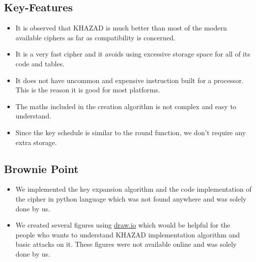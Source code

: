 \documentclass[preprint]{transcrypto}
\begin{document}
\subsection{Key-Features}
\begin{itemize}
    \item It is observed that KHAZAD is much better than most of the modern available ciphers as far as compatibility is concerned.
    \item It is a very fast cipher and it avoids using excessive storage space for all of its code and tables.
    \item It does not have uncommon and expensive instruction built for a processor. This is the reason it is good for most platforms.
    \item The maths included in the creation algorithm is not complex and easy to understand.
    \item Since the key schedule is similar to the round function, we don't require any extra storage.
\end{itemize}
\subsection{Brownie Point}
\begin{itemize}
    \item We implemented the key expansion algorithm and the code implementation of the cipher in python language which was not found anywhere and was solely done by us.
    \item We created several figures using \url{draw.io} which would be helpful for the people who wants to understand KHAZAD implementation algorithm and basic attacks on it. These figures were not available online and was solely done by us.
\end{itemize} 




\end{document}

